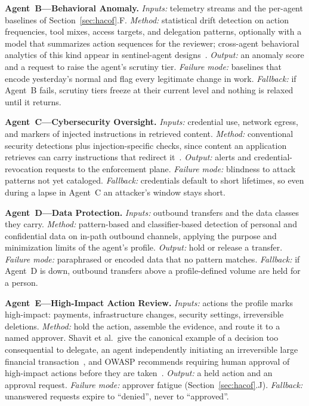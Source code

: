 \documentclass{ieeeaccess}
\begin{document}
\textbf{Agent~B---Behavioral Anomaly.} \textit{Inputs:} telemetry streams and the per-agent baselines of Section~\ref{sec:hacof}.F. \textit{Method:} statistical drift detection on action frequencies, tool mixes, access targets, and delegation patterns, optionally with a model that summarizes action sequences for the reviewer; cross-agent behavioral analytics of this kind appear in sentinel-agent designs~\cite{gosmar2025sentinel}.
\textit{Output:} an anomaly score and a request to raise the agent's scrutiny tier. \textit{Failure mode:} baselines that encode yesterday's normal and flag every legitimate change in work. \textit{Fallback:} if Agent~B fails, scrutiny tiers freeze at their current level and nothing is relaxed until it returns.

\textbf{Agent~C---Cybersecurity Oversight.} \textit{Inputs:} credential use, network egress, and markers of injected instructions in retrieved content. \textit{Method:} conventional security detections plus injection-specific checks, since content an application retrieves can carry instructions that redirect it~\cite{greshake2023injection}.
\textit{Output:} alerts and credential-revocation requests to the enforcement plane. \textit{Failure mode:} blindness to attack patterns not yet cataloged. \textit{Fallback:} credentials default to short lifetimes, so even during a lapse in Agent~C an attacker's window stays short.

\textbf{Agent~D---Data Protection.} \textit{Inputs:} outbound transfers and the data classes they carry. \textit{Method:} pattern-based and classifier-based detection of personal and confidential data on in-path outbound channels, applying the purpose and minimization limits of the agent's profile. \textit{Output:} hold or release a transfer. \textit{Failure mode:} paraphrased or encoded data that no pattern matches. \textit{Fallback:} if Agent~D is down, outbound transfers above a profile-defined volume are held for a person.

\textbf{Agent~E---High-Impact Action Review.} \textit{Inputs:} actions the profile marks high-impact: payments, infrastructure changes, security settings, irreversible deletions. \textit{Method:} hold the action, assemble the evidence, and route it to a named approver. Shavit et al.\ give the canonical example of a decision too consequential to delegate, an agent independently initiating an irreversible large financial transaction~\cite{shavit2023agentic},
and OWASP recommends requiring human approval of high-impact actions before they are taken~\cite{owasp2025llm}.
\textit{Output:} a held action and an approval request. \textit{Failure mode:} approver fatigue (Section~\ref{sec:hacof}.J). \textit{Fallback:} unanswered requests expire to ``denied'', never to ``approved''.
\end{document}

